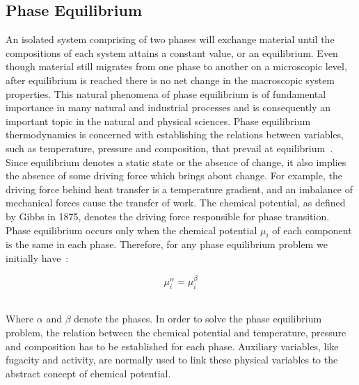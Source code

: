 \subsection{Phase Equilibrium}
An isolated system comprising of two phases will exchange material until the compositions of each system attains a constant value, or an equilibrium. Even though material still migrates from one phase to another on a microscopic level, after equilibrium is reached there is no net change in the macroscopic system properties. This natural phenomena of phase equilibrium is of fundamental importance in many natural and industrial processes and is consequently an important topic in the natural and physical sciences. Phase equilibrium thermodynamics is concerned with establishing the relations between variables, such as temperature, pressure and composition, that prevail at equilibrium~\cite{MolecularThermodynamicsOfFluidPhaseEquilibria, SmithNessAbbott}.\\

Since equilibrium denotes a static state or the absence of change, it also implies the absence of some driving force which brings about change. For example, the driving force behind heat transfer is a temperature gradient, and an imbalance of mechanical forces cause the transfer of work. The chemical potential, as defined by Gibbs in 1875, denotes the driving force responsible for phase transition. Phase equilibrium occurs only when the chemical potential $\mu_{i}$ of each component is the same in each phase. Therefore, for any phase equilibrium problem we initially have~\cite{MolecularThermodynamicsOfFluidPhaseEquilibria}:\

\begin{equation}
\mu_{i}^{\alpha} = \mu_{i}^{\beta}
\end{equation}\

Where $\alpha$ and $\beta$ denote the phases. In order to solve the phase equilibrium problem, the relation between the chemical potential and temperature, pressure and composition has to be established for each phase. Auxiliary variables, like fugacity and activity, are normally used to link these physical variables to the abstract concept of chemical potential.\


